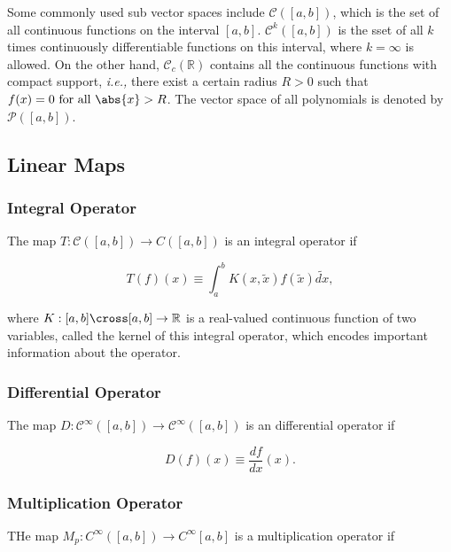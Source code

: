 \documentclass[a4paper,12pt]{report}
\begin{document}
Some commonly used sub vector spaces include \(\mathcal{C}([a,b])\), which is the set of all continuous functions on the interval \([a,b]\). \(\mathcal{C}^{k}([a,b]) \) is the sset of all \(k\) times continuously differentiable functions on this interval, where \(k = \infty\) is allowed. On the other hand, \(\mathcal{C}_{c} (\mathbb{R})\) contains all the continuous functions with compact support, \textit{i.e.,} there exist a certain radius \(R > 0\) such that \(f(x) = 0 \text{ for all } \abs{x} > R  \). The vector space of all polynomials is denoted by \(\mathcal{P}([a,b])\).             

\subsection{Linear Maps}

\subsubsection{Integral Operator}

The map \(T:\mathcal{C}([a,b]) \to C([a,b])\) is an integral operator if

\begin{equation}
    T(f)(x) \equiv \int_{a}^{b} K(x,\tilde{x} )f(\tilde{x} )\tilde{dx} , 
\end{equation}

where \(K:[a,b]\cross [a,b] \to \mathbb{R}\) is a real-valued continuous function of two variables, called the kernel of this integral operator, which encodes important information about the operator. 

\subsubsection{Differential Operator}

The map \(D:\mathcal{C}^{\infty}([a,b]) \to \mathcal{C}^{\infty}([a,b])  \) is an differential operator if 

\begin{equation}
    D(f)(x) \equiv \frac{df}{dx} (x). 
\end{equation}

\subsubsection{Multiplication Operator}

THe map \(M_{p}:C^{\infty}([a,b]) \to C^{\infty}[a,b]   \) is a multiplication operator if 
\end{document}
